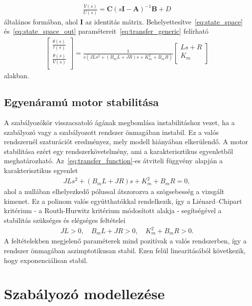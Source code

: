 \begin{align}\label{eq:transfer_generic}
    \frac{Y(s)}{U(s)} = \bm C{\left(s \bm I - \bm A\right)}^{-1} \bm B + D
\end{align}
általános formában, ahol $\bm I$ az identitás mátrix. Behelyettesítve~\eqref{eq:state_space} és~\eqref{eq:state_space_out}
paramétereit~\eqref{eq:transfer_generic} felírható
\begin{align}\label{eq:transfer_function}
    \begin{bmatrix}
        \frac{\theta(s)}{\tau(s)} \\ 
        \frac{\theta(s)}{V(s)} \\ 
    \end{bmatrix}
    =
    \frac{1}{s\left(JLs^2 + \left(B_m L + JR\right)s + K_m^2 + B_m R\right)}
    \begin{bmatrix}
        Ls + R \\ 
        K_m \\ 
    \end{bmatrix}
\end{align}
alakban.

\section{Egyenáramú motor stabilitása}
A szabályozókör visszacsatoló ágának megbomlása instabilitáshoz vezet, ha a 
szabályozó vagy a szabályozott rendszer önmagában instabil. Ez a valós rendszernél 
szaturációt eredményez, mely modell hiányában elkerülendő. A motor stabilitása ezért 
egy rendszerkövetelmény, ami a karakterisztikus egyenletből meghatározható.
Az~\eqref{eq:transfer_function}-es átviteli függvény alapján a karakterisztikus egyenlet
\begin{align}
    JLs^2 + \left(B_m L + JR\right)s + K_m^2 + B_m R = 0,
\end{align}
ahol a nullában elhelyezkedő pólussal átszorozva a szögsebesség a vizsgált kimenet.
Ez a polinom valós együtthatókkal rendelkezik, így a Liénard–Chipart kritérium - a Routh-Hurwitz kritérium módosított
alakja - segítségével a stabilitás szükséges és elégséges feltételei
\begin{align}
    JL>0,\quad B_m L + JR > 0,\quad K_m^2 + B_m R > 0.
\end{align}
A feltételekben megjelenő paraméterek mind pozitívak a valós rendszerben, így a rendszer
önmagában aszimptotikusan stabil. Ezen felül linearitásából következik, hogy exponenciálisan stabil.

\chapter{Szabályozó modellezése}\label{chap:controller}

